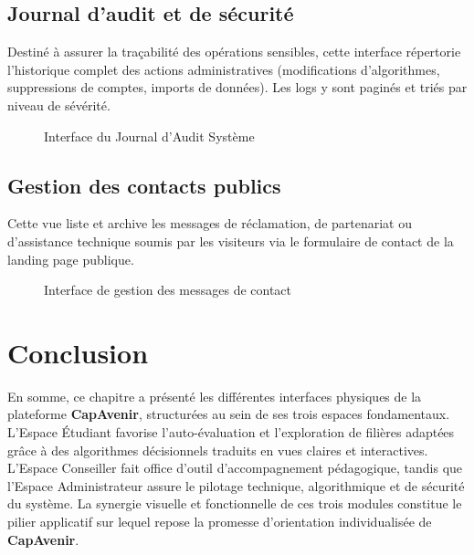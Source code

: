 \subsection{Journal d'audit et de sécurité}

Destiné à assurer la traçabilité des opérations sensibles, cette interface répertorie l'historique complet des actions administratives (modifications d'algorithmes, suppressions de comptes, imports de données). Les logs y sont paginés et triés par niveau de sévérité.

\begin{figure}[H]
    \centering
    \caption{Interface du Journal d'Audit Système}
    \label{fig:interface_audit_logs}
\end{figure}

\subsection{Gestion des contacts publics}

Cette vue liste et archive les messages de réclamation, de partenariat ou d'assistance technique soumis par les visiteurs via le formulaire de contact de la landing page publique.

\begin{figure}[H]
    \centering
    \caption{Interface de gestion des messages de contact}
    \label{fig:interface_contacts_management}
\end{figure}

\section*{Conclusion}

En somme, ce chapitre a présenté les différentes interfaces physiques de la plateforme \textbf{CapAvenir}, structurées au sein de ses trois espaces fondamentaux. L'Espace Étudiant favorise l'auto-évaluation et l'exploration de filières adaptées grâce à des algorithmes décisionnels traduits en vues claires et interactives. L'Espace Conseiller fait office d'outil d'accompagnement pédagogique, tandis que l'Espace Administrateur assure le pilotage technique, algorithmique et de sécurité du système. La synergie visuelle et fonctionnelle de ces trois modules constitue le pilier applicatif sur lequel repose la promesse d'orientation individualisée de \textbf{CapAvenir}.
